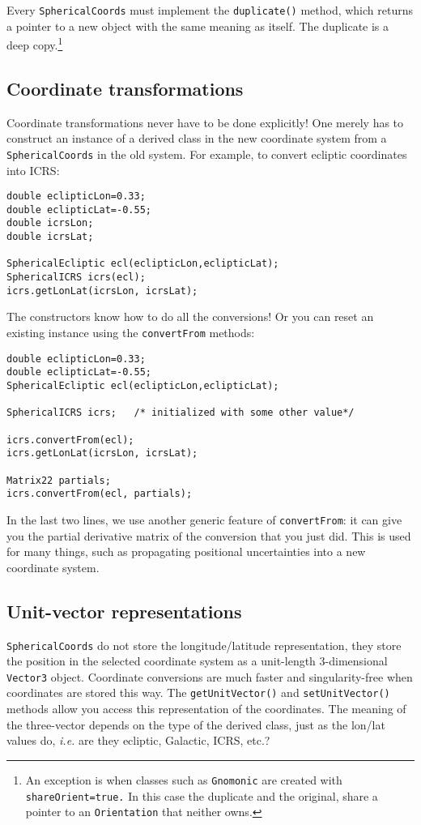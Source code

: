 \documentclass[11pt,preprint,flushrt]{aastex}
\begin{document}
Every {\tt SphericalCoords} must implement the {\tt duplicate()} method, which returns a pointer to a new object with the same meaning as itself.  The duplicate is a deep copy.\footnote{An exception is when classes such as {\tt Gnomonic} are created with {\tt shareOrient=true.}  In this case the duplicate and the original, share a pointer to an {\tt Orientation} that neither owns.}

\subsection{Coordinate transformations}
Coordinate transformations never have to be done explicitly! One merely has to construct an instance of a derived class in the new coordinate system from a {\tt SphericalCoords} in the old system.  For example, to convert ecliptic coordinates into ICRS:
\begin{verbatim}
double eclipticLon=0.33;
double eclipticLat=-0.55;
double icrsLon;
double icrsLat;

SphericalEcliptic ecl(eclipticLon,eclipticLat);
SphericalICRS icrs(ecl);
icrs.getLonLat(icrsLon, icrsLat);
\end{verbatim}
The constructors know how to do all the conversions!  Or you can reset an existing instance using the {\tt convertFrom} methods:
\begin{verbatim}
double eclipticLon=0.33;
double eclipticLat=-0.55;
SphericalEcliptic ecl(eclipticLon,eclipticLat);

SphericalICRS icrs;   /* initialized with some other value*/

icrs.convertFrom(ecl);
icrs.getLonLat(icrsLon, icrsLat);

Matrix22 partials;
icrs.convertFrom(ecl, partials);
\end{verbatim}
In the last two lines, we use another generic feature of {\tt convertFrom}: it can give you the partial derivative matrix of the conversion that you just did.  This is used for many things, such as propagating positional uncertainties into a new coordinate system.

\subsection{Unit-vector representations}
{\tt SphericalCoords} do not store the longitude/latitude representation, they store the position in the selected coordinate system as a unit-length 3-dimensional {\tt Vector3} object.  Coordinate conversions are much faster and singularity-free when coordinates are stored this way.  The {\tt getUnitVector()} and {\tt setUnitVector()} methods allow you access this representation of the coordinates.  The meaning of the three-vector depends on the type of the derived class, just as the lon/lat values do, {\it i.e.} are they ecliptic, Galactic, ICRS, etc.?
\end{document}
